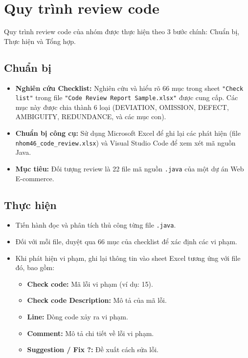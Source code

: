 \chapter{Quy trình review code}

Quy trình review code của nhóm được thực hiện theo 3 bước chính: Chuẩn bị, Thực hiện và Tổng hợp.

\section{Chuẩn bị}
\begin{itemize}
    \item \textbf{Nghiên cứu Checklist:} Nghiên cứu và hiểu rõ 66 mục trong sheet \texttt{"Check list"} trong file \texttt{"Code Review Report Sample.xlsx"} được cung cấp. Các mục này được chia thành 6 loại (DEVIATION, OMISSION, DEFECT, AMBIGUITY, REDUNDANCE, và các mục con).
    \item \textbf{Chuẩn bị công cụ:} Sử dụng Microsoft Excel để ghi lại các phát hiện (file \texttt{nhom46\_code\_review.xlsx}) và Visual Studio Code để xem xét mã nguồn Java.
    \item \textbf{Mục tiêu:} Đối tượng review là 22 file mã nguồn \texttt{.java} của một dự án Web E-commerce.
\end{itemize}

\section{Thực hiện}
\begin{itemize}
    \item Tiến hành đọc và phân tích thủ công từng file \texttt{.java}.
    \item Đối với mỗi file, duyệt qua 66 mục của checklist để xác định các vi phạm.
    \item Khi phát hiện vi phạm, ghi lại thông tin vào sheet Excel tương ứng với file đó, bao gồm:
    \begin{itemize}
        \item \textbf{Check code:} Mã lỗi vi phạm (ví dụ: 15).
        \item \textbf{Check code Description:} Mô tả của mã lỗi.
        \item \textbf{Line:} Dòng code xảy ra vi phạm.
        \item \textbf{Comment:} Mô tả chi tiết về lỗi vi phạm.
        \item \textbf{Suggestion / Fix ?:} Đề xuất cách sửa lỗi.
    \end{itemize}
\end{itemize}


